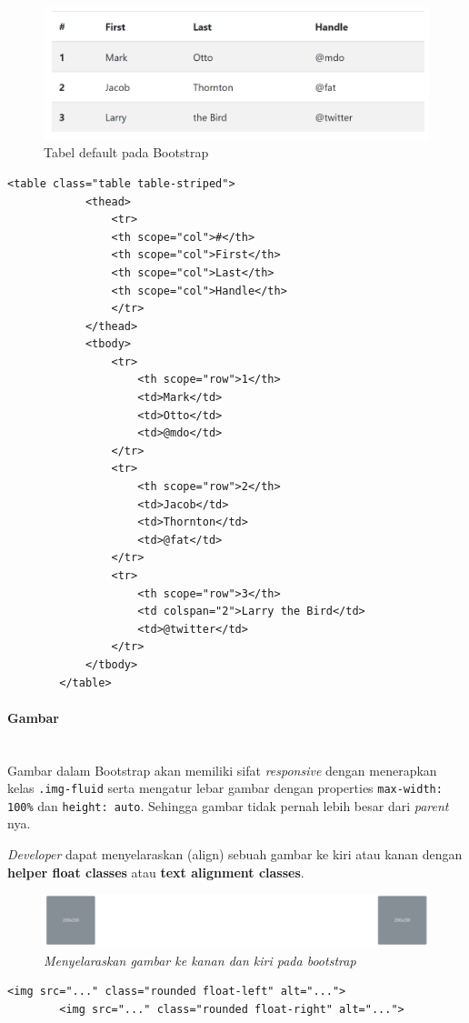 \documentclass[a4paper,twoside]{article}
\newcommand{\myparagraph}[1]{\paragraph{#1}\mbox{}\\}
\begin{document}
\begin{enumerate}
		\begin{figure} [H]
			\centering  
			\includegraphics[scale=0.7]{tablestriped_bootstrap.png}  
			\caption{Tabel default pada Bootstrap} 
		\end{figure}
		
		\begin{lstlisting}[frame=single] 
		<table class="table table-striped">
			<thead>
				<tr>
				<th scope="col">#</th>
				<th scope="col">First</th>
				<th scope="col">Last</th>
				<th scope="col">Handle</th>
				</tr>
			</thead>
			<tbody>
				<tr>
					<th scope="row">1</th>
					<td>Mark</td>
					<td>Otto</td>
					<td>@mdo</td>
				</tr>
				<tr>
					<th scope="row">2</th>
					<td>Jacob</td>
					<td>Thornton</td>
					<td>@fat</td>
				</tr>
				<tr>
					<th scope="row">3</th>
					<td colspan="2">Larry the Bird</td>
					<td>@twitter</td>
				</tr>
			</tbody>
		</table>
		\end{lstlisting}
		
		
		\myparagraph{Gambar}
		Gambar dalam Bootstrap akan memiliki sifat \textit{responsive} dengan menerapkan kelas \colorbox{mygray}{\texttt{.img-fluid}} serta mengatur lebar gambar dengan properties \colorbox{mygray}{\texttt{max-width: 100\%}} dan \texttt{height: auto}. Sehingga gambar tidak pernah lebih besar dari \textit{parent} nya. 
		
		\textit{Developer} dapat menyelaraskan (align) sebuah gambar ke kiri atau kanan dengan \textbf{helper float classes} atau \textbf{text alignment classes}. 
		\begin{figure} [H]
			\centering  
			\includegraphics[scale=0.7]{imgalign_bootstrap.PNG}  
			\caption{\it{Menyelaraskan gambar ke kanan dan kiri pada bootstrap}} 
		\end{figure}
		\begin{lstlisting}[frame=single]
		<img src="..." class="rounded float-left" alt="...">
		<img src="..." class="rounded float-right" alt="...">
		\end{lstlisting}
		

\end{enumerate}
\end{document}
